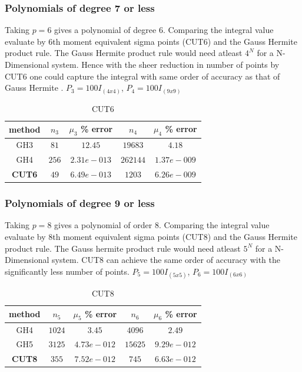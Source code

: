 \documentclass[letterpaper, 10 pt, conference]{ieeeconf}  %
\begin{document}
\subsubsection{Polynomials of degree 7 or less}
Taking $p=6$ gives a polynomial of degree 6. Comparing the integral value evaluate by 6th moment equivalent sigma points (CUT6) and the Gauss Hermite product rule. The Gauss Hermite product rule would need atleast $4^N$ for a N-Dimensional system. Hence with the sheer reduction in number of points by CUT6 one could capture the integral with same order of accuracy as that of Gauss Hermite .\newline
$P_3=100I_{(4x4)}$, $P_4=100I_{(9x9)}$
\begin{table}
\caption{CUT6}
\normalsize
\begin{center}
\begin{tabular}{|c||c|c||c|c|}
\hline
method     & 		$n_3$ 	 	 	&				$\mu_3$ \% error 		& 		$n_4$     & 	$\mu_4$ \% error						\\
\hline
GH3   	 &  	 	$81$ 			 	&	  		$	12.45$ 				 	    &   $19683$          &     $4.18$									 \\
\hline 
GH4   	 &  	 	$256$ 			 	&	  		$2.31e-013$ 				&     $262144$        &     $1.37e-009$									 \\
\hline
{\bf CUT6 	}		 &	  	$49$  				&  		$6.49e-013$ 				  &       $1203$      & 	$6.26e-009$									\\
\hline
\end{tabular}
\end{center}
\end{table}
\subsubsection{Polynomials of degree 9 or less}
Taking $p=8$ gives a polynomial of order 8. Comparing the integral value evaluate by 8th moment equivalent sigma points (CUT8) and the Gauss Hermite product rule. The Gauss hermite product rule would need atleast $5^N$ for a N-Dimensional system. CUT8 can achieve the same order of accuracy with the significantly less number of points. \newline
$P_5=100I_{(5x5)}$, $P_6=100I_{(6x6)}$
\begin{table}
\caption{CUT8}
\normalsize
\begin{center}
\begin{tabular}{|c||c|c||c|c|}
\hline
method     & 		$n_5$ 	 	 	&				$\mu_5$ \% error 		& 		$n_6$     & 	$\mu_6$ \% error						\\
\hline
GH4  	 &  	 	$1024$ 			 	&	  		$	3.45$ 				 	    &   $4096$          &     $2.49$									 \\
\hline 
GH5  	 &  	 	$3125$ 			 	&	  		$4.73e-012$ 				&     $15625$        &     $9.29e-012$									 \\
\hline
{\bf CUT8 }			 &	  	$355$  				&  		$7.52e-012$ 				  &       $745$      & 		$6.63e-012$									\\
\hline
\end{tabular}
\end{center}
\end{table}
\end{document}

